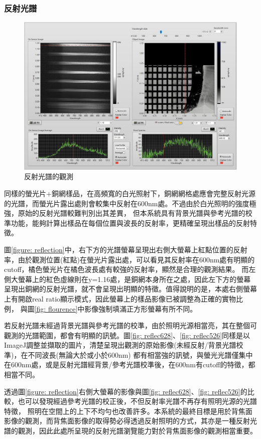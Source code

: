 \documentclass[12pt]{article}
\begin{document}
\subsubsection{反射光譜}
\begin{figure}
    \centering
    \includegraphics[width = 0.9\linewidth]{reflection (2).jpeg}
    \caption{反射光譜的觀測}
    \label{fig: reflec}
\end{figure}
同樣的螢光片+銅網樣品，在高頻寬的白光照射下，銅網網格處應會完整反射光源的光譜，而螢光片露出處則會較集中反射在600nm處。不過由於白光照明的強度極強，原始的反射光譜較難判別出其差異，
但本系統具有背景光譜與參考光譜的校準功能，能夠計算出樣品在每個位置與波長的反射率，更精確呈現出樣品的反射特徵。

圖\ref{figure: reflection}中，右下方的光譜螢幕呈現出右側大螢幕上紅點位置的反射率，由於觀測位置(紅點)在螢光片露出處，可以看見其反射率在600nm處有明顯的cutoff，橘色螢光片在橘色波長處有較強的反射率，顯然是合理的觀測結果。
而左側大螢幕上的紅色虛線則在y=1.16處，是銅網本身所在之處，因此左下方的螢幕呈現出銅網的反射光譜，就不會呈現出明顯的特徵。值得說明的是，本處右側螢幕上有開啟real ratio顯示模式，因此螢幕上的樣品影像已被調整為正確的實物比例，
與圖\ref{fig: flourence}中影像強制填滿正方形螢幕有所不同。

若反射光譜未經過背景光譜與參考光譜的校準，由於照明光源相當亮，其在整個可觀測的光譜範圍，都會有明顯的訊號。圖\ref{fig: reflec628}、\ref{fig: reflec526}同樣是以ImageJ調整並擷取的圖片，清楚呈現出觀測的原始影像(未經反射/背景光譜校準)，在不同波長(無論大於或小於600nm)
都有相當強的訊號，與螢光光譜僅集中在600nm處，或是反射光譜經背景/參考光譜校準後，在600nm有cutoff的特徵，都相當不同。

透過圖\ref{figure: reflection}右側大螢幕的影像與圖\ref{fig: reflec628}、\ref{fig: reflec526}的比較，也可以發現經過參考光譜的校正後，不但反射率光譜不再存有照明光源的光譜特徵，
照明在空間上的上下不均勻也改善許多。本系統的最終目標是用於背焦面影像的觀測，而背焦面影像的取得勢必得透過反射照明的方式，其亦是一種反射光譜的觀測，因此此處所呈現的反射光譜瀏覽能力對於背焦面影像的觀測相當重要。
\end{document}
